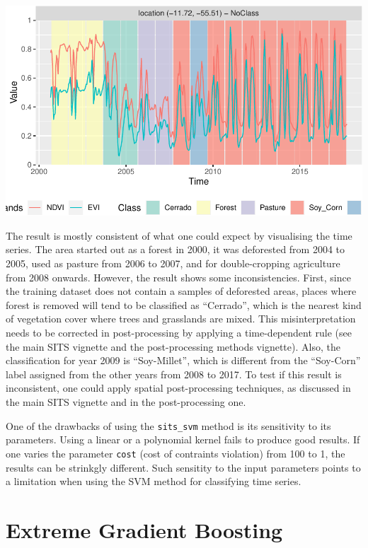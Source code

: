 \documentclass[a4paper,]{tufte-book}
\begin{document}
\begin{center}\includegraphics[width=0.7\linewidth]{sitsbook_files/figure-latex/unnamed-chunk-48-1} \end{center}

The result is mostly consistent of what one could expect by visualising the time series. The area started out as a forest in 2000, it was deforested from 2004 to 2005, used as pasture from 2006 to 2007, and for double-cropping agriculture from 2008 onwards. However, the result shows some inconsistencies. First, since the training dataset does not contain a samples of deforested areas, places where forest is removed will tend to be classified as ``Cerrado'', which is the nearest kind of vegetation cover where trees and grasslands are mixed. This misinterpretation needs to be corrected in post-processing by applying a time-dependent rule (see the main SITS vignette and the post-processing methods vignette). Also, the classification for year 2009 is ``Soy-Millet'', which is different from the ``Soy-Corn'' label assigned from the other years from 2008 to 2017. To test if this result is inconsistent, one could apply spatial post-processing techniques, as discussed in the main SITS vignette and in the post-processing one.

One of the drawbacks of using the \texttt{sits\_svm} method is its sensitivity to its parameters. Using a linear or a polynomial kernel fails to produce good results. If one varies the parameter \texttt{cost} (cost of contraints violation) from 100 to 1, the results can be strinkgly different. Such sensitity to the input parameters points to a limitation when using the SVM method for classifying time series.

\hypertarget{extreme-gradient-boosting}{%
\section{Extreme Gradient Boosting}\label{extreme-gradient-boosting}}
\end{document}

